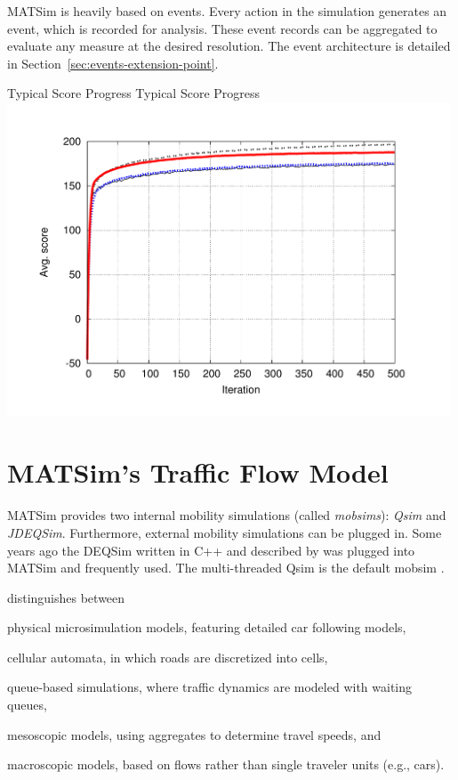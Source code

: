 MATSim is heavily based on events. Every action in the simulation generates an event, which is recorded for analysis. These event records can be aggregated to evaluate any measure at the desired resolution. The event architecture is detailed in Section~\ref{sec:events-extension-point}.

\createfigure%
{Typical Score Progress }%
{Typical Score Progress}%
{\label{fig:scoreprogress}}%
{\includegraphics[width=0.99\textwidth, angle=0]{using/figures/scores.pdf}}%
{}

\section{MATSim's Traffic Flow Model}
\label{sec:trafficflowmodel}
MATSim provides two internal mobility simulations (called \emph{mobsims}): \emph{Qsim} and \emph{JDEQSim}. Furthermore, external mobility simulations can be plugged in. Some years ago the DEQSim written in C++ and described by \citet[][]{Charypar_PhDThesis_2008, CharyparEtAl_TRR_2007, CharyparEtAl_TRB_2009, CharyparEtAl_WCTRS_2007} was plugged into MATSim and frequently used. The multi-threaded Qsim is the default mobsim \citep[][]{MATSim_Userguide_2014}. %

\citet[][]{CharyparEtAl_TRB_2009} distinguishes between 
\begin{compactitem}
\item physical microsimulation models, featuring detailed car following models,
\item cellular automata, in which roads are discretized into cells,
\item queue-based simulations, where traffic dynamics are modeled with waiting queues,
\item mesoscopic models, using aggregates to determine travel speeds, and
\item macroscopic models, based on flows rather than single traveler units (e.g., cars).
\end{compactitem}

